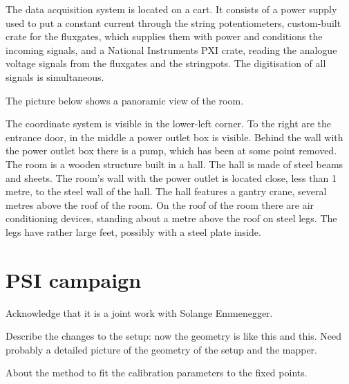 The data acquisition system is located on a cart. It consists of a power supply used to put a constant current through the string potentiometers, custom-built crate for the fluxgates, which supplies them with power and conditions the incoming signals, and a National Instruments PXI crate, reading the analogue voltage signals from the fluxgates and the stringpots. The digitisation of all signals is simultaneous.

The picture below shows a panoramic view of the room.

The coordinate system is visible in the lower-left corner. To the right are the entrance door, in the middle a power outlet box is visible. Behind the wall with the power outlet box there is a pump, which has been at some point removed. The room is a wooden structure built in a hall. The hall is made of steel beams and sheets. The room's wall with the power outlet is located close, less than 1 metre, to the steel wall of the hall. The hall features a gantry crane, several metres above the roof of the room. On the roof of the room there are air conditioning devices, standing about a metre above the roof on steel legs. The legs have rather large feet, possibly with a steel plate inside.



\section{PSI campaign}

Acknowledge that it is a joint work with Solange Emmenegger.

Describe the changes to the setup: now the geometry is like this and this. Need probably a detailed picture of the geometry of the setup and the mapper.

About the method to fit the calibration parameters to the fixed points.